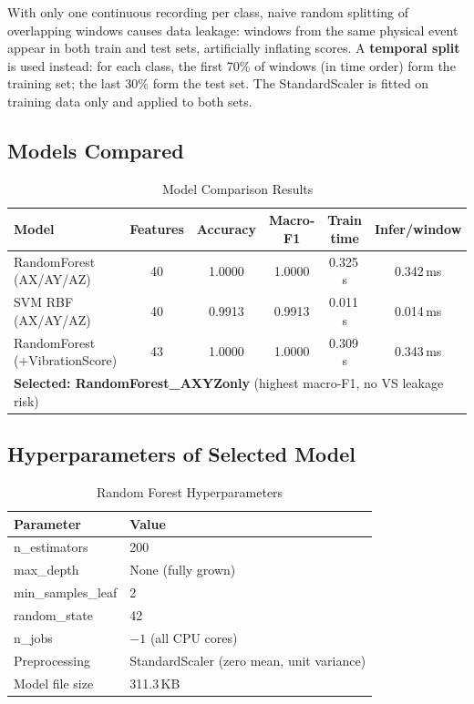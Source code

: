 \documentclass[12pt,a4paper]{report}
\begin{document}
With only one continuous recording per class, naive random splitting of
overlapping windows causes data leakage: windows from the same physical
event appear in both train and test sets, artificially inflating scores.
A \textbf{temporal split} is used instead: for each class, the first 70\%
of windows (in time order) form the training set; the last 30\% form the
test set. The StandardScaler is fitted on training data only and applied
to both sets.

\subsection{Models Compared}

\begin{table}[H]
  \centering
  \caption{Model Comparison Results}
  \label{tab:models}
  \begin{tabular}{lccccc}
    \toprule
    \textbf{Model} & \textbf{Features} & \textbf{Accuracy} & \textbf{Macro-F1} &
    \textbf{Train time} & \textbf{Infer/window} \\
    \midrule
    RandomForest (AX/AY/AZ)        & 40 & 1.0000 & 1.0000 & 0.325\,s & 0.342\,ms \\
    SVM RBF (AX/AY/AZ)             & 40 & 0.9913 & 0.9913 & 0.011\,s & 0.014\,ms \\
    RandomForest (+VibrationScore) & 43 & 1.0000 & 1.0000 & 0.309\,s & 0.343\,ms \\
    \midrule
    \multicolumn{6}{l}{\textbf{Selected: RandomForest\_AXYZonly} (highest macro-F1, no VS leakage risk)} \\
    \bottomrule
  \end{tabular}
\end{table}

\subsection{Hyperparameters of Selected Model}

\begin{table}[H]
  \centering
  \caption{Random Forest Hyperparameters}
  \label{tab:rf_params}
  \begin{tabular}{ll}
    \toprule
    \textbf{Parameter} & \textbf{Value} \\
    \midrule
    n\_estimators      & 200 \\
    max\_depth         & None (fully grown) \\
    min\_samples\_leaf & 2 \\
    random\_state      & 42 \\
    n\_jobs            & $-1$ (all CPU cores) \\
    Preprocessing      & StandardScaler (zero mean, unit variance) \\
    Model file size    & 311.3\,KB \\
    \bottomrule
  \end{tabular}
\end{table}
\end{document}

